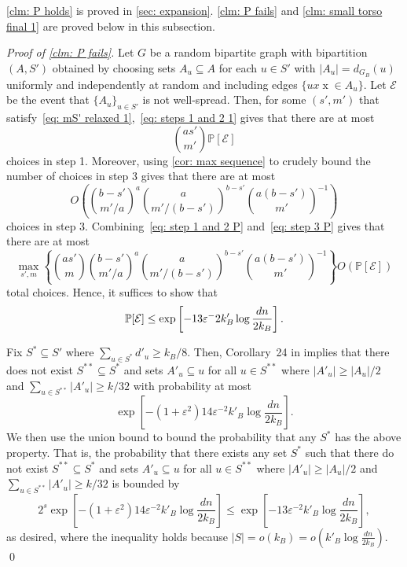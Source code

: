 \documentclass[11pt]{article}
\newcommand{\eps}{\varepsilon}
\def\P{\mathbb P}
\theoremstyle{plain}
\begin{document}
\cref{clm: P holds} is proved in \cref{sec: expansion}. \cref{clm: P fails} and \cref{clm: small torso final 1} are proved below in this subsection.

\medskip

\noindent\textit{Proof of \cref{clm: P fails}.}
Let $G$ be a random bipartite graph with bipartition $(A,S')$ obtained by choosing sets $A_u \subseteq A$ for each $u \in S'$ with $|A_u| = d_{G_B}(u)$ uniformly and independently at random and including edges $\{ux \mathrel x \in A_u\}$. Let $\mathcal E$ be the event that $\{A_u\}_{u \in S'}$ is not well-spread. Then, for some $(s',m')$ that satisfy~\eqref{eq: mS' relaxed 1},~\eqref{eq: steps 1 and 2 1} gives that there are at most 
        \begin{equation}\label{eq: step 1 and 2 P}
        \binom{as'}{m'}\P[\mathcal E]
        \end{equation}
        choices in step 1. Moreover, using \cref{cor: max sequence} to crudely bound the number of choices in step 3 gives that there are at most 
        \begin{equation}\label{eq: step 3 P}
            O\left(\binom{b - s'}{m'/a}^a\binom{a}{m'/(b - s')}^{b-s'}\binom{a(b - s')}{m'}^{-1}\right)
        \end{equation}
        choices in step 3. Combining~\eqref{eq: step 1 and 2 P} and~\eqref{eq: step 3 P} gives that there are at most 
        \[
        \max_{s', m}\left\{ \binom{as'}{m}\binom{b - s'}{m'/a}^a\binom{a}{m'/(b - s')}^{b-s'}\binom{a(b - s')}{m'}^{-1} \right\}O(\P[\mathcal E])
        \]
        total choices. Hence, it suffices to show that 
        \begin{equation}
            \P[\mathcal E] \leq \exp\left[-13\eps^-2k'_B\log\frac{dn}{2k_B}\right].\notag
        \end{equation}

    Fix $S^* \subseteq S'$ where $\sum_{u \in S^*}d'_u \geq k_B/8$. Then, Corollary~24 in \cite{osthus2003densities} implies that there does not exist $S^{**} \subseteq S^*$ and sets $A'_u \subseteq u$ for all $u \in S^{**}$ where $|A'_u| \geq |A_u|/2$ and $\sum_{u \in S^{**}}|A'_u| \geq k/32$ with probability at most 
    \[
    \exp\left[-(1 +\varepsilon^2)14\varepsilon^{-2}k'_{B}\log\frac{dn}{2k_B}\right].
    \]
    We then use the union bound to bound the probability that any $S^*$ has the above property. That is, the probability that there exists any set $S^*$ such that there do not exist $S^{**} \subseteq S^*$ and sets $A'_u \subseteq u$ for all $u \in S^{**}$ where $|A'_u| \geq |A_u|/2$ and $\sum_{u \in S^{**}}|A'_u| \geq k/32$ is bounded by 
    \[
    2^{s}\exp\left[-(1 +\varepsilon^2)14\varepsilon^{-2}k'_{B}\log\frac{dn}{2k_B}\right] \leq \exp\left[-13\varepsilon^{-2}k'_B\log\frac{dn}{2k_B}\right],
    \]
    as desired, where the inequality holds because $|S| = o(k_B) = o\left(k'_B\log\frac{dn}{2k_B}\right)$.
    \qed
\end{document}
